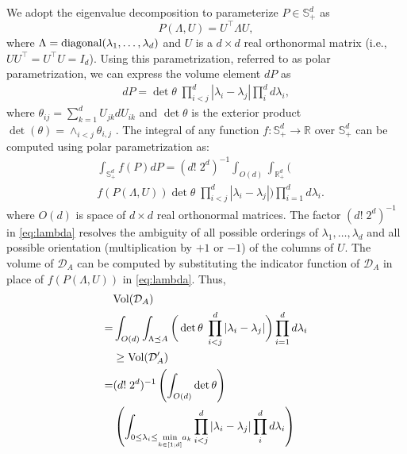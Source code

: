 \documentclass[Afour,sageh,times]{sagej}
\begin{document}
We adopt the eigenvalue decomposition to parameterize $P \in \mathbb{S}^d_{+}$ as
\[P(\Lambda,U)=U^\top \Lambda U,\]
where $\Lambda=\textup{diagonal}(\lambda_1, \dots, \lambda_d)$ and $U$ is a $d\times d$ real orthonormal matrix (i.e., $UU^\top=U^\top U=I_d$). Using this parametrization, referred to as polar parametrization, we can express the volume element $dP$ as
\begin{align*}
dP = \det \theta \;   \prod_{i<j}^d |\lambda_i-\lambda_j| \prod_i^d d\lambda_i, 
\end{align*}
where $\theta_{ij}=\sum_{k=1}^d U_{jk}dU_{ik}$ and
$\det \theta$ is the exterior product $\det(\theta)= \wedge_{i<j} \theta_{i,j}$ \cite{terras2012harmonic, mathai1997jacobians}.
The integral of any function $f:\mathbb{S}^d_{+} \rightarrow \mathbb{R}$ over $\mathbb{S}^d_{+}$ can be computed using polar parametrization as: 
\begin{align}
\nonumber
    &\int_{\mathbb{S}^d_{+}} f(P) dP = (d! \; 2^d)^{-1}  \int_{O(d)} \int_{\mathbb{R}^d_{+}}\bigg(\\
    \label{eq:lambda}
    &  f(P(\Lambda, U))\det \theta \;   \prod_{i<j}^d |\lambda_i-\lambda_j|\bigg) \prod_{i=1}^d d\lambda_i. 
\end{align}
where $O(d)$ is space of $d\times d$ real orthonormal matrices. The factor $(d! \; 2^d)^{-1}$ in \eqref{eq:lambda} resolves the ambiguity of all possible orderings of $\lambda_1, \dots, \lambda_d$ and all possible orientation (multiplication by $+1$ or $-1$) of the columns of $U$.
 The volume of $\mathcal{D}_A$ can be computed by substituting the indicator function of $\mathcal{D}_A$ in place of $f(P(\Lambda,U))$ in \eqref{eq:lambda}. Thus,
\begin{align*}
&\textup{Vol}(\mathcal{D}_A) \nonumber\\
=&\int_{O(d)} \int_{\Lambda\preceq A}\bigg(\det \theta \;   \prod_{i<j}^d |\lambda_i-\lambda_j|\bigg) \prod_{i=1}^d d\lambda_i\nonumber\\
 &\geq\textup{Vol}(\mathcal{D}'_A)\nonumber\\
 =&(d! \; 2^d)^{-1} \left( \int_{O(d)} \det \theta \right) \\
&\left( \int_{0 \leq \lambda_i \leq \underset{k\in[1;d]}{\min}a_k} 
 \prod_{i<j}^d |\lambda_i-\lambda_j| \prod_i^d d\lambda_i\right)
\end{align*}
\end{document}
